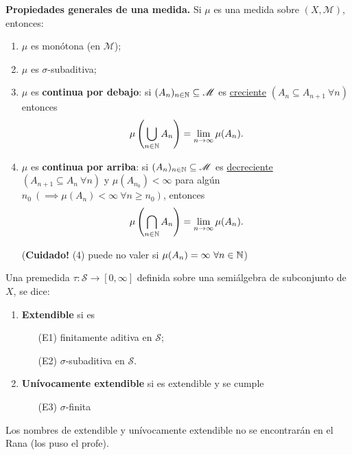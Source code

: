\noindent \textbf{Propiedades generales de una medida.} Si $\mu$ es una medida sobre $(X,\mathscr{M})$, entonces:
\begin{enumerate}
	\item $\mu$ es monótona (en $\mathscr{M}$);

	\item $\mu$ es $\sigma$-subaditiva;

	\item $\mu$ es \textbf{continua por debajo}: si $(A_n)_{n\in\mathbb{N}} \subseteq \mathscr{M}$ es \underline{creciente} $(A_n \subseteq A_{n+1}\ \forall n)$ entonces
	\[ \mu \left( \bigcup_{n\in\mathbb{N}} A_n \right) = \lim_{n \to \infty} \mu(A_n). \]

	\item $\mu$ es \textbf{continua por arriba}: si $(A_n)_{n\in\mathbb{N}} \subseteq \mathscr{M}$ es \underline{decreciente} $(A_{n+1} \subseteq A_n\ \forall n)$ y $\mu(A_{n_0})<\infty$ para algún $n_0\ (\implies \mu(A_n)<\infty\ \forall n\geq n_0)$, entonces
	\[ \mu \left( \bigcap_{n\in\mathbb{N}}A_n \right) = \lim_{n \to \infty} \mu(A_n). \]

	\noindent (\textbf{Cuidado!} (4) puede no valer si $\mu (A_n) = \infty \ \forall n \in \mathbb{N}$)
\end{enumerate}

\begin{definition}
	Una premedida $\tau : \mathscr{S} \to [0,\infty]$ definida sobre una semiálgebra de subconjunto de $X$, se dice:
	\begin{enumerate}
		\item \textbf{Extendible} si es
		\begin{enumerate}
			\item[(E1)] finitamente aditiva en $\mathscr{S}$;

			\item[(E2)] $\sigma$-subaditiva en $\mathscr{S}$.
		\end{enumerate}

		\item \textbf{Unívocamente extendible} si es extendible y se cumple
		\begin{enumerate}
			\item[(E3)] $\sigma$-finita
		\end{enumerate}
	\end{enumerate}
\end{definition}

\begin{remark}
	Los nombres de extendible y unívocamente extendible no se encontrarán en el Rana (los puso el profe).
\end{remark}

